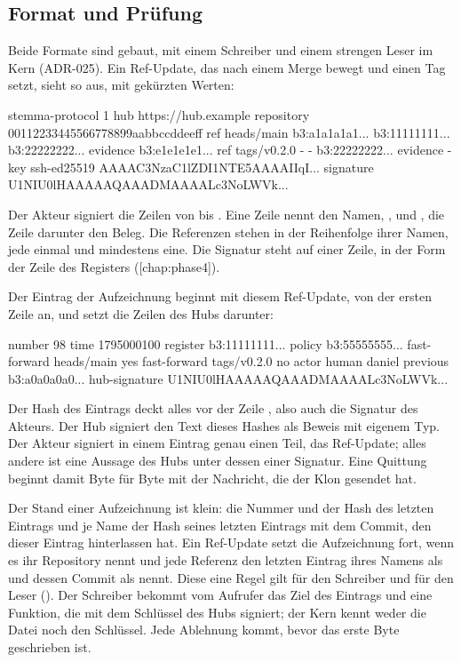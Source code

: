 \subsection{Format und Prüfung}

Beide Formate sind gebaut, mit einem Schreiber und einem strengen Leser im Kern (ADR-025).
Ein Ref-Update, das  nach einem Merge bewegt und einen Tag setzt, sieht so aus, mit
gekürzten Werten:

\starttyping
stemma-protocol 1
hub https://hub.example
repository 00112233445566778899aabbccddeeff
ref heads/main b3:a1a1a1a1... b3:11111111... b3:22222222...
evidence b3:e1e1e1e1...
ref tags/v0.2.0 - - b3:22222222...
evidence -
key ssh-ed25519 AAAAC3NzaC1lZDI1NTE5AAAAIIqI...
signature U1NIU0lHAAAAAQAAADMAAAALc3NoLWVk...
\stoptyping

Der Akteur signiert die Zeilen von  bis .
Eine Zeile  nennt den Namen, ,  und , die Zeile
 darunter den Beleg.
Die Referenzen stehen in der Reihenfolge ihrer Namen, jede einmal und mindestens eine.
Die Signatur steht auf einer Zeile, in der Form der Zeile  des Registers
([chap:phase4]).

Der Eintrag der Aufzeichnung beginnt mit diesem Ref-Update, von der ersten Zeile an, und setzt
die Zeilen des Hubs darunter:

\starttyping
number 98
time 1795000100
register b3:11111111...
policy b3:55555555...
fast-forward heads/main yes
fast-forward tags/v0.2.0 no
actor human daniel
previous b3:a0a0a0a0...
hub-signature U1NIU0lHAAAAAQAAADMAAAALc3NoLWVk...
\stoptyping

Der Hash des Eintrags deckt alles vor der Zeile , also auch die Signatur
des Akteurs.
Der Hub signiert den Text dieses Hashes als Beweis mit eigenem Typ.
Der Akteur signiert in einem Eintrag genau einen Teil, das Ref-Update; alles andere ist eine
Aussage des Hubs unter dessen einer Signatur.
Eine Quittung beginnt damit Byte für Byte mit der Nachricht, die der Klon gesendet hat.

Der Stand einer Aufzeichnung ist klein: die Nummer und der Hash des letzten Eintrags und je Name
der Hash seines letzten Eintrags mit dem Commit, den dieser Eintrag hinterlassen hat.
Ein Ref-Update setzt die Aufzeichnung fort, wenn es ihr Repository nennt und jede Referenz den
letzten Eintrag ihres Namens als  und dessen Commit als  nennt.
Diese eine Regel gilt für den Schreiber und für den Leser ().
Der Schreiber bekommt vom Aufrufer das Ziel des Eintrags und eine Funktion, die mit dem
Schlüssel des Hubs signiert; der Kern kennt weder die Datei noch den Schlüssel.
Jede Ablehnung kommt, bevor das erste Byte geschrieben ist.

